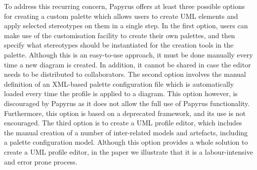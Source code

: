 To address this recurring concern, Papyrus offers at least three possible options for creating a custom palette which allows users to create UML elements and apply selected stereotypes on them in a single step. 
In the first option, users can make use of the customisation facility to create their own palettes, and then specify what stereotypes should be instantiated for the creation tools in the palette.
Although this is an easy-to-use approach, it must be done manually every time a new diagram is created.
In addition, it cannot be shared in case the editor needs to be distributed to collaborators. 
The second option involves the manual definition of an XML-based palette configuration file which is automatically loaded every time the profile is applied to a diagram. 
This option however, is discouraged by Papyrus as it does not allow the full use of Papyrus functionality.
Furthermore, this option is based on a deprecated framework, and its use is not encouraged. 
The third option is to create a UML profile editor, which includes the manual creation of a number of inter-related models and artefacts, including a palette configuration model. 
Although this option provides a whole solution to create a UML profile editor, in the paper we illustrate that it is a labour-intensive and error prone process.


